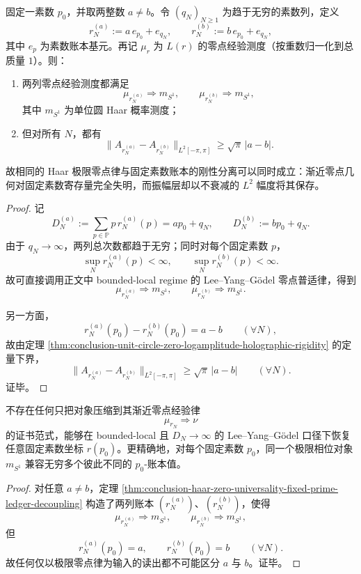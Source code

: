\begin{theorem}\label{thm:conclusion-haar-zero-universality-fixed-prime-ledger-decoupling}
固定一素数 \(p_0\)，并取两整数 \(a\neq b\)。令 \((q_N)_{N\ge 1}\) 为趋于无穷的素数列，定义
\[
r_N^{(a)}:=a\,e_{p_0}+e_{q_N},
\qquad
r_N^{(b)}:=b\,e_{p_0}+e_{q_N},
\]
其中 \(e_p\) 为素数账本基元。再记 \(\mu_r\) 为 \(L(r)\) 的零点经验测度（按重数归一化到总质量 \(1\)）。则：
\begin{enumerate}
  \item 两列零点经验测度都满足
  \[
  \mu_{r_N^{(a)}}\Rightarrow m_{S^1},
  \qquad
  \mu_{r_N^{(b)}}\Rightarrow m_{S^1},
  \]
  其中 \(m_{S^1}\) 为单位圆 Haar 概率测度；
  \item 但对所有 \(N\)，都有
  \[
  \|A_{r_N^{(a)}}-A_{r_N^{(b)}}\|_{L^2[-\pi,\pi]}
  \ge
  \sqrt{\pi}\,|a-b|.
  \]
\end{enumerate}
故相同的 Haar 极限零点律与固定素数账本的刚性分离可以同时成立：渐近零点几何对固定素数寄存量完全失明，而振幅层却以不衰减的 \(L^2\) 幅度将其保存。
\end{theorem}
\begin{proof}
记
\[
D_N^{(a)}:=\sum_{p\in\mathbb P}p\,r_N^{(a)}(p)=ap_0+q_N,
\qquad
D_N^{(b)}:=bp_0+q_N.
\]
由于 \(q_N\to\infty\)，两列总次数都趋于无穷；同时对每个固定素数 \(p\)，
\[
\sup_N r_N^{(a)}(p)<\infty,
\qquad
\sup_N r_N^{(b)}(p)<\infty.
\]
故可直接调用正文中 bounded-local regime 的 Lee--Yang--Gödel 零点普适律，得到
\[
\mu_{r_N^{(a)}}\Rightarrow m_{S^1},
\qquad
\mu_{r_N^{(b)}}\Rightarrow m_{S^1}.
\]

另一方面，
\[
r_N^{(a)}(p_0)-r_N^{(b)}(p_0)=a-b
\qquad(\forall N),
\]
故由定理 \ref{thm:conclusion-unit-circle-zero-logamplitude-holographic-rigidity} 的定量下界，
\[
\|A_{r_N^{(a)}}-A_{r_N^{(b)}}\|_{L^2[-\pi,\pi]}
\ge
\sqrt{\pi}\,|a-b|
\qquad(\forall N).
\]
证毕。
\end{proof}

\begin{corollary}[仅依赖渐近零点律的相位证书无法恢复固定素数记账]\label{cor:conclusion-asymptotic-zero-law-certificate-cannot-recover-fixed-prime}
不存在任何只把对象压缩到其渐近零点经验律
\[
\mu_{r_N}\Rightarrow \nu
\]
的证书范式，能够在 bounded-local 且 \(D_N\to\infty\) 的 Lee--Yang--Gödel 口径下恢复任意固定素数坐标 \(r(p_0)\)。更精确地，对每个固定素数 \(p_0\)，同一个极限相位对象 \(m_{S^1}\) 兼容无穷多个彼此不同的 \(p_0\)-账本值。
\end{corollary}
\begin{proof}
对任意 \(a\neq b\)，定理 \ref{thm:conclusion-haar-zero-universality-fixed-prime-ledger-decoupling} 构造了两列账本 \((r_N^{(a)})\)、\((r_N^{(b)})\)，使得
\[
\mu_{r_N^{(a)}}\Rightarrow m_{S^1},
\qquad
\mu_{r_N^{(b)}}\Rightarrow m_{S^1},
\]
但
\[
r_N^{(a)}(p_0)=a,
\qquad
r_N^{(b)}(p_0)=b
\qquad(\forall N).
\]
故任何仅以极限零点律为输入的读出都不可能区分 \(a\) 与 \(b\)。证毕。
\end{proof}

